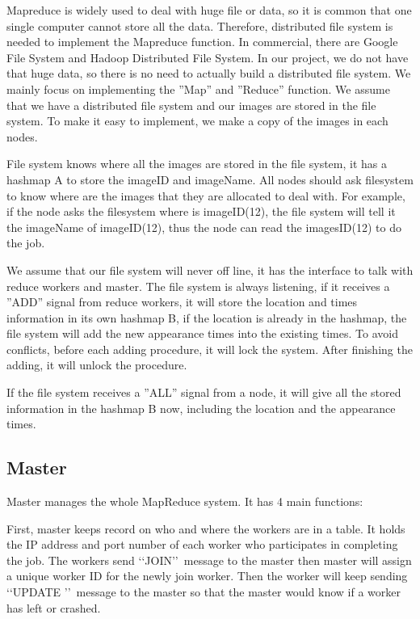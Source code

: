\documentclass[12pt]{article}
\begin{document}
Mapreduce is widely used to deal with huge file or data, so it is common that one single computer cannot store all the data. Therefore, distributed file system is needed to implement the Mapreduce function. In commercial, there are Google File System and Hadoop Distributed File System. In our project, we do not have that huge data, so there is no need to actually build a distributed file system. We mainly focus on implementing the ”Map” and ”Reduce” function. We assume that we have a distributed file system and our images are stored in the file system. To make it easy to implement, we make a copy of the images in each nodes.

File system knows where all the images are stored in the file system, it has a hashmap A to store the imageID and imageName. All nodes should ask filesystem to know where are the images that they are allocated to deal with. For example, if the node asks the filesystem where is imageID(12), the file system will tell it the imageName of imageID(12), thus the node can read the imagesID(12) to do the job.

We assume that our file system will never off line, it has the interface to talk with reduce workers and master. The file system is always listening, if it receives a ”ADD” signal from reduce workers, it will store the location and times information in its own hashmap B, if the location is already in the hashmap, the file system will add the new appearance times into the existing times. To avoid conflicts, before each adding procedure, it will lock the system. After finishing the adding, it will unlock the procedure.

If the file system receives a ”ALL” signal from a node, it will give all the stored information in the hashmap B now, including the location and the appearance times. 


\subsection{Master}

Master manages the whole MapReduce system. It has 4 main functions: 

First, master keeps record on who and where the workers are in a table. It holds the IP address and 
port number of each worker who participates in completing the job. The workers send \lq\lq JOIN\rq\rq\  
message to the master then master will assign a unique worker ID for the newly join worker.
Then the worker will keep sending \lq\lq UPDATE \rq\rq\ message to the master so that the master would know
if a worker has left or crashed.
  
\end{document}
